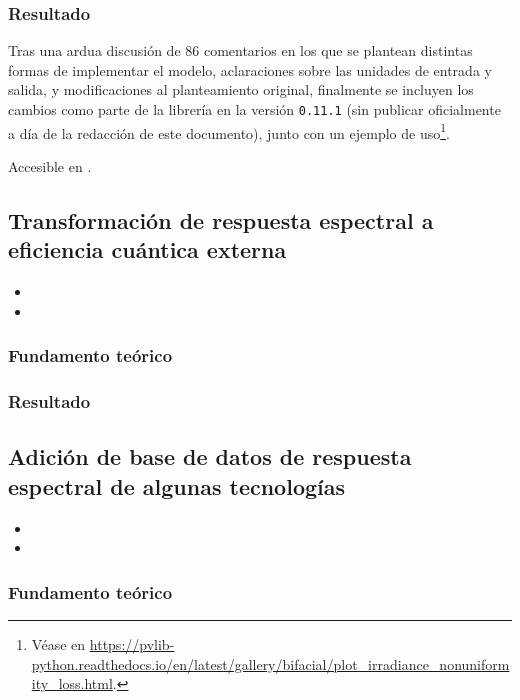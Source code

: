 \subsubsection{Resultado}

Tras una ardua discusión de 86 comentarios en los que se plantean distintas formas de implementar el modelo, aclaraciones sobre las unidades de entrada y salida, y modificaciones al planteamiento original, finalmente se incluyen los cambios como parte de la librería en la versión \texttt{0.11.1} (sin publicar oficialmente a día de la redacción de este documento), junto con un ejemplo de uso\footnote{Véase en \url{https://pvlib-python.readthedocs.io/en/latest/gallery/bifacial/plot_irradiance_nonuniformity_loss.html}.}.

Accesible en .

\subsection{Transformación de respuesta espectral a eficiencia cuántica externa}

\begin{itemize}
    \item {}
    \item {}
\end{itemize}

\subsubsection{Fundamento teórico}

\subsubsection{Resultado}

\subsection{Adición de base de datos de respuesta espectral de algunas tecnologías}

\begin{itemize}
    \item {}
    \item {}
\end{itemize}

\subsubsection{Fundamento teórico}


